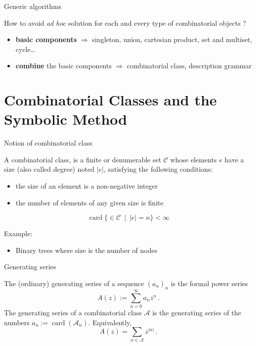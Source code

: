 \documentclass[compress,11pt]{beamer}
\def\opstyle#1{\ensuremath{\operatorname{#1}}}
\newcommand{\card}{\opstyle{card}}
\newcommand{\mA}{\mathcal{A}}
\newcommand{\mC}{\mathcal{C}}
\renewcommand{\emph}[1]{{\color{red} #1}}
\begin{document}
\begin{frame}{Generic algorithms}
  \begin{QUESTION}
    \Large
    How to avoid \textit{ad hoc} solution for each and every type of
    combinatorial objects ?
  \end{QUESTION}
  \pause\bigskip
   \begin{itemize}
   \item \textbf{basic components}
     $\Longrightarrow$ singleton, union, cartesian product, set and
     multiset, cycle\dots\pause\bigskip
   \item \textbf{combine} the basic components
     $\Longrightarrow$ combinatorial class, description grammar
   \end{itemize}
  \pause\bigskip

\end{frame}


\section{Combinatorial Classes and the Symbolic Method}

\begin{frame}{Notion of combinatorial class}
  \begin{DEFN}
    A \emph{combinatorial class}, is a finite or denumerable set $\mC$ whose
    elements $e$ have a size (also called degree) noted $|e|$, satisfying the
    following conditions:
    \begin{itemize}
    \item the size of an element is a non-negative integer
    \item the number of elements of any given size is finite
    \end{itemize}
    \[
    \card\{\in \mC\ \mid\ |e| = n\} < \infty
    \]
  \end{DEFN}
  \bigskip

  Example:
  \begin{itemize}
  \item Binary trees where size is the number of nodes
  \end{itemize}
\end{frame}

\begin{frame}{Generating series}
  
  \begin{DEFN}
    The (ordinary) \emph{generating series} of a sequence $(a_n)_n$ 
    is the formal power series
    \begin{equation*}
      A(z) := \sum_{n=0}^{\infty} a_n z^n\,.
    \end{equation*}
    The \emph{generating series} of a combinatorial class $\mA$ is the
    generating series of the numbers $a_n := \card(\mA_n)$. Equivalently,
    \begin{equation*}
      A(z) = \sum_{\alpha\in\mA} z^{|\alpha|}\,.
    \end{equation*}
  \end{DEFN}
\end{frame}
\end{document}
